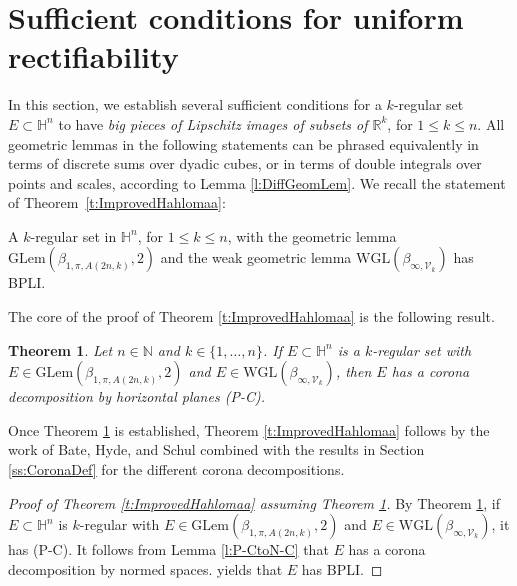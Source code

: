 \documentclass[12pt]{amsart}
\newcommand{\R}{\mathbb R}
\renewcommand{\H}{\mathbb H}
\numberwithin{equation}{section}
\theoremstyle{plain}
\newtheorem{theorem}{Theorem}[section]
\theoremstyle{definition}
\theoremstyle{remark}
\begin{document}
\section{Sufficient conditions for uniform rectifiability}\label{s:SuffCond}%
In this section, we establish several sufficient conditions for a $k$-regular set $E\subset \H^n$ to have \emph{big pieces of Lipschitz images of subsets of $\R^k$}, for $1\leq k\leq n$. All geometric lemmas in the following statements can be phrased equivalently in terms of discrete sums over dyadic cubes, or in terms of double integrals over points and scales, according to Lemma \ref{l:DiffGeomLem}. We recall the statement of Theorem~\ref{t:ImprovedHahlomaa}: 

\medskip

A $k$-regular set in $\mathbb{H}^n$, for $1\leq k\leq n$, with the geometric lemma $\mathrm{GLem}(\beta_{1,\pi,A(2n,k)},2)$ and the weak geometric lemma $\mathrm{WGL}(\beta_{\infty,\mathcal{V}_k})$ has BPLI.  

\medskip

The core of the proof of Theorem \ref{t:ImprovedHahlomaa} is the following result.

\begin{theorem}\label{t:FromWeakAssToCoronaByNormed}
    Let $n\in \mathbb{N}$ and $k\in \{1,\ldots,n\}$. If $E\subset \mathbb{H}^n$ is a $k$-regular set with $E\in \mathrm{GLem}(\beta_{1,\pi,A(2n,k)},2)$ and $E\in \mathrm{WGL}(\beta_{\infty,\mathcal{V}_k})$, then $E$ has a corona decomposition by horizontal planes (P-C).
\end{theorem}

Once Theorem \ref{t:FromWeakAssToCoronaByNormed} is established, Theorem \ref{t:ImprovedHahlomaa} follows by the work of Bate, Hyde, and Schul \cite{Bate} combined with the results in Section \ref{ss:CoronaDef} for the different corona decompositions.


\begin{proof}[Proof of Theorem \ref{t:ImprovedHahlomaa} assuming Theorem \ref{t:FromWeakAssToCoronaByNormed}]
    By Theorem \ref{t:FromWeakAssToCoronaByNormed}, if $E\subset \mathbb{H}^n$ is  $k$-regular with $E\in \mathrm{GLem}(\beta_{1,\pi,A(2n,k)},2)$ and $E\in \mathrm{WGL}(\beta_{\infty,\mathcal{V}_k})$, it has (P-C). It follows from Lemma 
    \ref{l:P-CtoN-C}
    that $E$ has a corona decomposition by normed spaces. \cite[Theorem B]{Bate} yields that $E$ has BPLI.
\end{proof}
\end{document}
